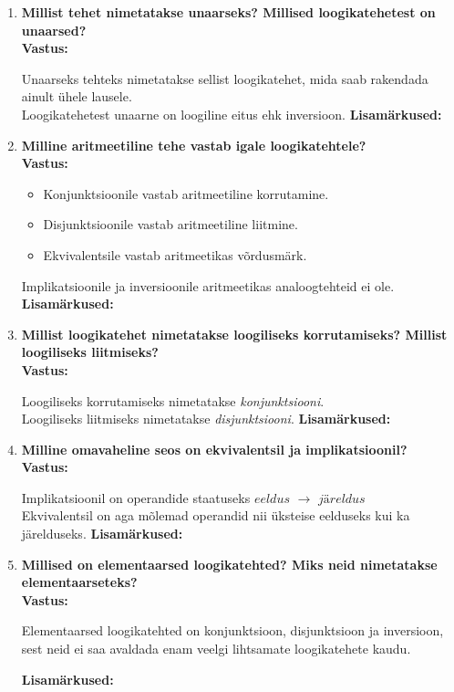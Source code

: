 \documentclass[a4paper,12pt]{article}
\makeatletter
\newenvironment{question}[1]{%
  \item \textbf{#1} \vspace{0.5em} \\ %
  \textbf{Vastus:} \vspace{0.25em} \\ %
  \def\@lisamarkused{} %
}{%
  \if\relax\detokenize\expandafter{\@lisamarkused}\relax %
  \else
    \vspace{0.5em} %
    \textbf{Lisamärkused:} \\ %
    \@lisamarkused %
  \fi
  \vspace{1em} %
}
\makeatother
\begin{document}
\begin{enumerate}[left=0pt]
\begin{question}{Millist tehet nimetatakse unaarseks? Millised loogikatehetest on unaarsed?}
  Unaarseks tehteks nimetatakse sellist loogikatehet, mida saab rakendada ainult ühele lausele. \\ 
  Loogikatehetest unaarne on loogiline eitus ehk inversioon.
\end{question}
\newpage 
\begin{question}{Milline aritmeetiline tehe vastab igale loogikatehtele?}
  \begin{itemize} 
    \item Konjunktsioonile vastab aritmeetiline korrutamine. 
    \item Disjunktsioonile vastab aritmeetiline liitmine. 
    \item Ekvivalentsile vastab aritmeetikas võrdusmärk.  
  \end{itemize}

  Implikatsioonile ja inversioonile aritmeetikas analoogtehteid ei ole. 
\end{question}


\begin{question}{Millist loogikatehet nimetatakse loogiliseks korrutamiseks? Millist loogiliseks liitmiseks?}
  Loogiliseks korrutamiseks nimetatakse \textit{konjunktsiooni}. \\ 
  Loogiliseks liitmiseks nimetatakse \textit{disjunktsiooni}.
\end{question}

\begin{question}{Milline omavaheline seos on ekvivalentsil ja implikatsioonil?}
  Implikatsioonil on operandide staatuseks $\textit{eeldus}$ $\rightarrow$ $\textit{järeldus}$ \\ 
  Ekvivalentsil on aga mõlemad operandid nii üksteise eelduseks kui ka järelduseks. 
\end{question}

\begin{question}{Millised on elementaarsed loogikatehted? Miks neid nimetatakse elementaarseteks?}
  Elementaarsed loogikatehted on konjunktsioon, disjunktsioon ja inversioon, sest 
  neid ei saa avaldada enam veelgi lihtsamate loogikatehete kaudu.


\end{question}
\end{enumerate}
\end{document}
